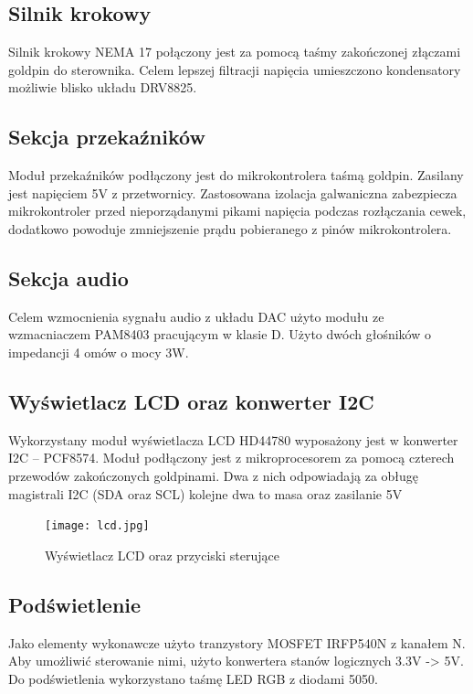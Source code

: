 \documentclass[10pt, a4paper]{article}
\begin{document}
\subsection{Silnik krokowy}
Silnik krokowy NEMA 17 połączony jest za pomocą taśmy zakończonej złączami goldpin do sterownika. Celem lepszej filtracji napięcia umieszczono kondensatory możliwie blisko układu DRV8825.

\subsection{Sekcja przekaźników}
Moduł przekaźników podłączony jest do mikrokontrolera taśmą goldpin. Zasilany jest napięciem 5V z przetwornicy. Zastosowana izolacja galwaniczna zabezpiecza mikrokontroler przed nieporządanymi pikami napięcia podczas rozłączania cewek, dodatkowo powoduje zmniejszenie prądu pobieranego z pinów mikrokontrolera.

\subsection{Sekcja audio}
Celem wzmocnienia sygnału audio z układu DAC użyto modułu ze wzmacniaczem PAM8403 pracującym w klasie D. Użyto dwóch głośników o impedancji 4 omów o mocy 3W.

\subsection{Wyświetlacz LCD oraz konwerter I2C}
Wykorzystany moduł wyświetlacza LCD HD44780 wyposażony jest w konwerter I2C -- PCF8574. Moduł podłączony jest z mikroprocesorem za pomocą czterech przewodów zakończonych goldpinami. Dwa z nich odpowiadają za obługę magistrali I2C (SDA oraz SCL) kolejne dwa to masa oraz zasilanie 5V

\begin{figure}[H]
	\centering
	\texttt{[image: lcd.jpg]}
	\caption{Wyświetlacz LCD oraz przyciski sterujące}
	\label{fig:LCD}
\end{figure}



\subsection{Podświetlenie}
Jako elementy wykonawcze użyto tranzystory MOSFET IRFP540N z kanałem N. Aby umożliwić sterowanie nimi, użyto konwertera stanów logicznych 3.3V -> 5V. Do podświetlenia wykorzystano taśmę LED RGB z diodami 5050.
\end{document}
